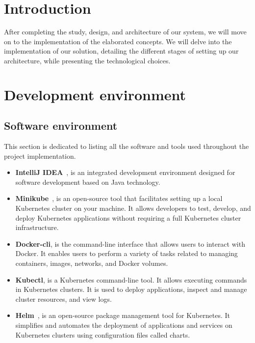 
\section{Introduction}
After completing the study, design, and architecture of our system, we will move on to the implementation of the elaborated concepts.
We will delve into the implementation of our solution, detailing the different stages of setting up our architecture, while presenting the technological choices.

\section{Development environment}

\subsection{Software environment}
This section is dedicated to listing all the software and tools used throughout the project implementation.

\begin{itemize}
    \item[-] \textbf{IntelliJ IDEA}~\cite{Intel}, is an integrated development environment designed for software development based on Java technology.
    \item[-] \textbf{Minikube}~\cite{minikube}, is an open-source tool that facilitates setting up a local Kubernetes cluster on your machine. It allows developers to test, develop, and deploy Kubernetes applications without requiring a full Kubernetes cluster infrastructure.
    \item[-] \textbf{Docker-cli}, is the command-line interface that allows users to interact with Docker. It enables users to perform a variety of tasks related to managing containers, images, networks, and Docker volumes.
    \item[-] \textbf{Kubectl}, is a Kubernetes command-line tool. It allows executing commands in Kubernetes clusters. It is used to deploy applications, inspect and manage cluster resources, and view logs.
    \item[-] \textbf{Helm}~\cite{helm}, is an open-source package management tool for Kubernetes. It simplifies and automates the deployment of applications and services on Kubernetes clusters using configuration files called charts.
\end{itemize}

